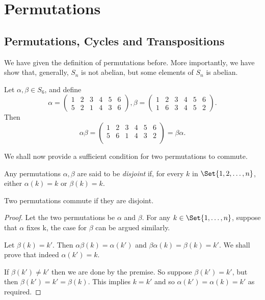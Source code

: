 \documentclass[main.tex]{subfiles}
\begin{document}
		\section{Permutations}
			\subsection{Permutations, Cycles and Transpositions}
				We have given the definition of permutations before. More importantly, we have show that, generally, $S_n$ is not abelian, but some elements of $S_n$ is abelian.
				\begin{example}
					Let $\alpha, \beta \in S_6$, and define
					\begin{equation*}
						\alpha =
						\begin{pmatrix}
							1 & 2 & 3 & 4 & 5 & 6\\
							5 & 2 & 1 & 4 & 3 & 6
						\end{pmatrix},
						\beta =
						\begin{pmatrix}
							1 & 2 & 3 & 4 & 5 & 6\\
							1 & 6 & 3 & 4 & 5 & 2
						\end{pmatrix}.
					\end{equation*}
					Then
					\begin{equation*}
						\alpha\beta = 
						\begin{pmatrix}
							1 & 2 & 3 & 4 & 5 & 6\\
							5 & 6 & 1 & 4 & 3 & 2\\
						\end{pmatrix}
						= \beta\alpha.
					\end{equation*}
				\end{example}
				We shall now provide a sufficient condition for two permutations to commute.
				\begin{definition}
					Any permutations $\alpha, \beta$ are said to be \textit{disjoint} if, for every $k$ in $\Set{1, 2, \ldots, n}$, either $\alpha(k) = k$ or $\beta(k) = k$.
				\end{definition}
				\begin{theorem}
					Two permutations commute if they are disjoint.
				\end{theorem}
				\begin{proof}
					Let the two permutations be $\alpha$ and $\beta$. For any $k \in \Set{1, \ldots, n}$, suppose that $\alpha$ fixes k, the case for $\beta$ can be argued similarly. 
					
					Let $\beta(k) = k'$. Then $\alpha\beta (k) = \alpha(k')$ and $\beta\alpha(k) = \beta(k) = k'$. We shall prove that indeed $\alpha(k') = k$.
					
					If $\beta(k') \neq k'$ then we are done by the premise. So suppose $\beta(k') = k'$, but then $\beta(k') = k' = \beta(k)$. This implies $k = k'$ and so $\alpha(k') = \alpha(k) = k'$ as required.
				\end{proof}
			
\end{document}
